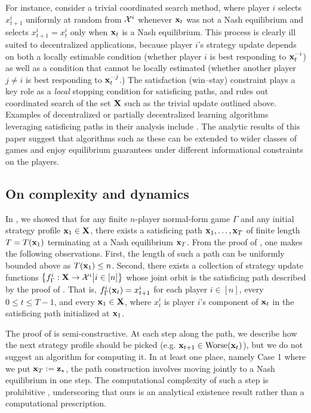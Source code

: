 {For instance, consider a trivial coordinated search method, where player $i$ selects $x^i_{t+1}$ uniformly at random from $\mathcal{X}^i$ whenever ${\mathbf{x}}_t$ was not a Nash equilibrium and selects $x^i_{t+1} = x^i_t$ only when ${\mathbf{x}}_t$ is a Nash equilibrium. This process is clearly ill suited to decentralized applications, because player $i$'s strategy update depends on both a locally estimable condition (whether player $i$ is best responding to ${\mathbf{x}}^{-i}_t$) as well as a condition that cannot be locally estimated (whether another player $j \not=i $ is best responding to ${\mathbf{x}}^{-j}_t$.) The satisfaction (win--stay) constraint plays a key role as a \emph{local} stopping condition for satisficing paths, and rules out coordinated search of the set ${\mathbf{X}}$ such as the trivial update outlined above. Examples of decentralized or partially decentralized learning algorithms leveraging satisficing paths in their analysis include \cite{foster2006regret,marden2009payoff,arslan2017decentralized,yongacoglu2023satisficing}. The analytic results of this paper suggest that algorithms such as these can be extended to wider classes of games and enjoy equilibrium guarantees under different informational constraints on the players. 




\subsection*{On complexity and dynamics}

In , we showed that for any finite $n$-player normal-form game $\Gamma$ and any initial strategy profile ${\mathbf{x}}_1 \in {\mathbf{X}}$, there exists a satisficing path $ {\mathbf{x}}_1, \dots , {\mathbf{x}}_T $ of finite length $T = T({\mathbf{x}}_1)$ terminating at a Nash equilibrium ${\mathbf{x}}_T$. From the proof of , one makes the following observations. First, the length of such a path can be uniformly bounded above as $T({\mathbf{x}}_1 ) \leq n$. Second, there exists a collection of strategy update functions $\left\{ f^i_{\Gamma} : {\mathbf{X}} \to \mathcal{X}^i \middle| i \in [n] \right\}$ whose joint orbit is the satisficing path described by the proof of . That is, $f^i_{\Gamma} ( {\mathbf{x}}_t ) = x^i_{t+1}$ for each player $i \in [n]$, every $0 \leq t \leq T-1$, and every ${\mathbf{x}}_1 \in {\mathbf{X}}$, where $x^i_t$ is player $i$'s component of ${\mathbf{x}}_t$ in the satisficing path initialized at ${\mathbf{x}}_1$. 




The proof of  is semi-constructive. At each step along the path, we describe how the next strategy profile should be picked (e.g. ${\mathbf{x}}_{t+1} \in {\rm Worse}({\mathbf{x}}_t)$), but we do not suggest an algorithm for computing it. In at least one place, namely Case 1 where  we put ${\mathbf{x}}_{T} := {\mathbf{z}}_{\star}$, the path construction involves moving jointly to a Nash equilibrium in one step. The computational complexity of such a step is prohibitive \cite{daskalakis2009complexity}, underscoring that ours is an analytical existence result rather than a computational prescription.

}
